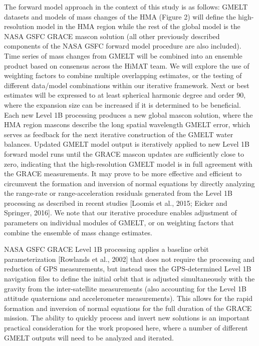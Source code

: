 \documentclass[review,oneside]{igs}
\begin{document}
The forward model approach in the context of this study is as follows: GMELT datasets and models of mass changes of the HMA (Figure 2) will define the high-resolution model in the HMA region while the rest of the global model is the NASA GSFC GRACE mascon solution (all other previously described components of the NASA GSFC forward model procedure are also included). Time series of mass changes from GMELT will be combined into an ensemble product based on consensus across the HiMAT team. We will explore the use of weighting factors to combine multiple overlapping estimates, or the testing of different data/model combinations within our iterative framework. Next or best estimates will be expressed to at least spherical harmonic degree and order 90, where the expansion size can be increased if it is determined to be beneficial. Each new Level 1B processing produces a new global mascon solution, where the HMA region mascons describe the long spatial wavelength GMELT error, which serves as feedback for the next iterative construction of the GMELT water balances. Updated GMELT model output is iteratively applied to new Level 1B forward model runs until the GRACE mascon updates are sufficiently close to zero, indicating that the high-resolution GMELT model is in full agreement with the GRACE measurements. It may prove to be more effective and efficient to circumvent the formation and inversion of normal equations by directly analyzing the range-rate or range-acceleration residuals generated from the Level 1B processing as described in recent studies [Loomis et al., 2015; Eicker and Springer, 2016]. We note that our iterative procedure enables adjustment of parameters on individual modules of GMELT, or on weighting factors that combine the ensemble of mass change estimates.

NASA GSFC GRACE Level 1B processing applies a baseline orbit parameterization [Rowlands et al., 2002] that does not require the processing and reduction of GPS measurements, but instead uses the GPS-determined Level 1B navigation files to define the initial orbit that is adjusted simultaneously with the gravity from the inter-satellite measurements (also accounting for the Level 1B attitude quaternions and accelerometer measurements). This allows for the rapid formation and inversion of normal equations for the full duration of the GRACE mission. The ability to quickly process and invert new solutions is an important practical consideration for the work proposed here, where a number of different GMELT outputs will need to be analyzed and iterated.
\end{document}
